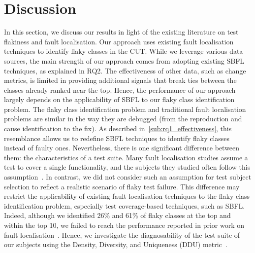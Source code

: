 \section{Discussion}
\label{sec:sherloc-discussion}

In this section, we discuss our results in light of the existing literature on test flakiness and fault localisation.
Our approach uses existing fault localisation techniques to identify flaky classes in the CUT.
While we leverage various data sources, the main strength of our approach comes from adopting existing SBFL techniques, as explained in RQ2. The effectiveness of other data, such as change metrics, is limited in providing additional signals that break ties between the classes already ranked near the top. Hence, the performance of our approach largely depends on the applicability of SBFL to our flaky class identification problem.  
The flaky class identification problem and traditional fault localisation problems are similar in the way they are debugged (\ie from the reproduction and cause identification to the fix). As described in~\ref{sub:rq1_effectiveness}, this resemblance allows us to redefine SBFL techniques to identify flaky classes instead of faulty ones. Nevertheless, there is one significant difference between them: the characteristics of a test suite. 
Many fault localisation studies assume a test to cover a single functionality, and the subjects they studied often follow this assumption~\cite{Lou:2021:fse,Li:2019:issta,Wen:2019:tse}.
In contrast, we did not consider such an assumption for test subject selection to reflect a realistic scenario of flaky test failure. 
This difference may restrict the applicability of existing fault localisation techniques to the flaky class identification problem, especially test coverage-based techniques, such as SBFL.
Indeed, although we identified 26\% and 61\% of flaky classes at the top and within the top 10, we failed to reach the performance reported in prior work on fault localisation~\cite{Wong:2016:tse}. Hence, we investigate %
the diagnosability of the test suite of our subjects using the Density, Diversity, and Uniqueness (DDU) metric~\cite{perez:2017:icse}. 

